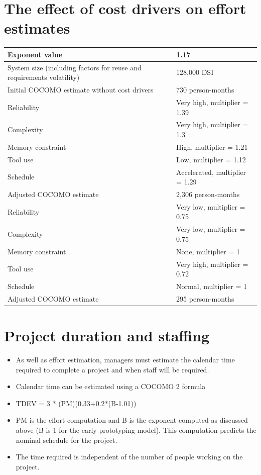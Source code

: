 \section{The effect of cost drivers on effort estimates}
\begin{table}[h!]
\centering
\begin{tabular}{ |p{3cm}|p{8cm}|  }
\hline
Exponent value & 1.17\\
\hline
\hline
System size (including factors for reuse and requirements volatility) & 128,000 DSI\\
\hline
Initial COCOMO estimate without cost drivers & 730 person-months\\
\hline
Reliability & Very high, multiplier = 1.39\\
\hline
Complexity & Very high, multiplier = 1.3\\
\hline
Memory constraint & High, multiplier = 1.21\\
\hline
Tool use & Low, multiplier = 1.12\\
\hline
Schedule & Accelerated, multiplier = 1.29\\
\hline
Adjusted COCOMO estimate & 2,306 person-months\\
\hline
\hline
Reliability & Very low, multiplier = 0.75\\
\hline
Complexity & Very low, multiplier = 0.75\\
\hline
Memory constraint & None, multiplier = 1\\
\hline
Tool use & Very high, multiplier = 0.72\\
\hline
Schedule & Normal, multiplier = 1\\
\hline
Adjusted COCOMO estimate & 295 person-months\\
\hline
\end{tabular}

\label{table:T6_4}
\end{table}

\section{Project duration and staffing}
\begin{itemize}

\item As well as effort estimation, managers must estimate the calendar time required to complete a project and when staff will be required.
\item Calendar time can be estimated using a COCOMO 2 formula
\item TDEV = 3 * (PM)(0.33+0.2*(B-1.01))
\item PM is the effort computation and B is the exponent computed as discussed above (B is 1 for the early prototyping model). This computation predicts the nominal schedule for the project.
\item The time required is independent of the number of people working on the project.

\end{itemize}

